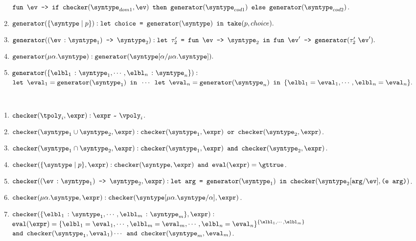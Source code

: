 \begin{definition}
\begin{enumerate}
    $\mkfunv{\ev}{
      \ife{\mkche{\syntype_{dom1}}{\ev}}{\mkgen{\syntype_{cod1}}}{\\\mkgen{\syntype_{cod2}}}
    }$. 
    \item $\mkgen{\mktset{\syntype}{p}} : \texttt{let choice = }\mkgen{\syntype} \texttt{ in } \take{p}{choice}.$
    \item $\mkgen{\mkdfun{\ev}{\syntype_1}{\syntype_2}} : \texttt{let $\tau_2'$ = }\mkfunv{\ev}{\syntype_2} \texttt{ in }\mkfunv{\ev'}{\mkgen{\tau_2'\ \ev'}}.$
    \item $\mkgen{\mkmiu{\alpha}{\syntype}} : \mkgen{\substitute{\syntype}{\alpha}{\mkmiu{\alpha}{\syntype}}}.$
    \item $\mkgen{\{\hastype{\elbl_1}{\syntype_1}, \cdots, \hastype{\elbl_n}{\syntype_n}\}} :$ \\ $\texttt{let }\eval_1 = \mkgen{\syntype_1}\texttt{ in }\cdots\texttt{ let }\eval_n = \mkgen{\syntype_n}\texttt{ in } \{\elbl_1 = \eval_1, \cdots, \elbl_n = \eval_n\}.$
  \end{enumerate}
\end{definition}

\begin{definition}
  \label{def_cheExt}
  \ \par 
  \begin{enumerate}
    \item $\mkche{\tpoly_i}{\expr} : \matches{\expr}{\vpoly_i}$.
    \item $\mkche{\mkunion{\syntype_1}{\syntype_2}}{\expr} : \mkche{\syntype_1}{\expr} \texttt{ or } \mkche{\syntype_2}{\expr}$.
    \item $\mkche{\mkintersect{\syntype_1}{\syntype_2}}{\expr} : \mkche{\syntype_1}{\expr} \texttt{ and } \mkche{\syntype_2}{\expr}$. 
    \item $\mkche{\mktset{\syntype}{p}}{\expr} : \mkche{\syntype}{\expr} \texttt{ and } \evaluate{\expr} = \gttrue$.
    \item $\mkche{\mkdfun{\ev}{\syntype_1}{\syntype_2}}{\expr} : \texttt{let arg = } \mkgen{\syntype_1} \texttt{ in } \mkche{\substitute{\syntype_2}{\texttt{arg}}{\ev}}{\texttt{(e arg)}}$.
    \item $\mkche{\mkmiu{\alpha}{\syntype}}{\expr} : \mkche{\substitute{\syntype}{\mkmiu{\alpha}{\syntype}}{\alpha}}{\expr}$.
    \item $\mkche{\{\hastype{\elbl_1}{\syntype_1}, \cdots, \hastype{\elbl_m}{\syntype_m}\}}{\expr} :$
    $\evaluate{\expr} = \{\elbl_1 = \eval_1, \cdots, \elbl_m = \eval_m, \cdots, \elbl_n = \eval_n\}^{\{\elbl_1, \cdots, \elbl_m\}}$ \\ 
    $\texttt{and } \mkche{\syntype_1}{\eval_1} \cdots \texttt{ and } \mkche{\syntype_m}{\eval_m}$.
  \end{enumerate}
\end{definition}
